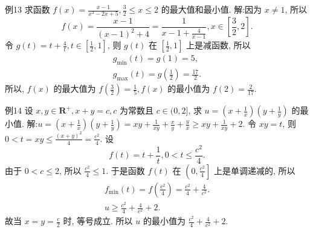 例13 求函数 $f(x)=\frac{x-1}{x^2-2 x+5}, \frac{3}{2} \leqslant x \leqslant 2$ 的最大值和最小值.
解:因为 $x \neq 1$, 所以
$$
f(x)=\frac{x-1}{(x-1)^2+4}=\frac{1}{x-1+\frac{4}{x-1}}, x \in\left[\frac{3}{2}, 2\right] .
$$
令 $g(t)=t+\frac{4}{t}, t \in\left[\frac{1}{2}, 1\right]$, 则 $g(t)$ 在 $\left[\frac{1}{2}, 1\right]$ 上是减函数, 所以
$$
\begin{gathered}
g_{\min }(t)=g(1)=5, \\
g_{\max }(t)=g\left(\frac{1}{2}\right)=\frac{17}{2} .
\end{gathered}
$$
所以, $f(x)$ 的最大值为 $f\left(\frac{3}{2}\right)=\frac{1}{5}, f(x)$ 的最小值为 $f(2)=\frac{2}{17}$.



例14 设 $x, y \in \mathbf{R}^{+}, x+y=c, c$ 为常数且 $c \in(0,2]$, 求 $u=\left(x+\frac{1}{x}\right)\left(y+\frac{1}{y}\right)$ 的最小值.
解:$u=\left(x+\frac{1}{x}\right)\left(y+\frac{1}{y}\right)=x y+\frac{1}{x y}+\frac{x}{y}+\frac{y}{x} \geqslant x y+\frac{1}{x y}+2$.
令 $x y=t$, 则 $0<t=x y \leqslant \frac{(x+y)^2}{4}=\frac{c^2}{4}$. 设
$$
f(t)=t+\frac{1}{t}, 0<t \leqslant \frac{c^2}{4} .
$$
由于 $0<c \leqslant 2$, 所以 $\frac{c^2}{4} \leqslant 1$. 于是函数 $f(t)$ 在 $\left(0, \frac{c^2}{4}\right]$ 上是单调递减的, 所以
$$
\begin{gathered}
f_{\min }(t)=f\left(\frac{c^2}{4}\right)=\frac{c^2}{4}+\frac{4}{c^2} . \\
u \geqslant \frac{c^2}{4}+\frac{4}{c^2}+2 .
\end{gathered}
$$
故当 $x=y=\frac{c}{2}$ 时, 等号成立.
所以 $u$ 的最小值为 $\frac{c^2}{4}+\frac{4}{c^2}+2$.



